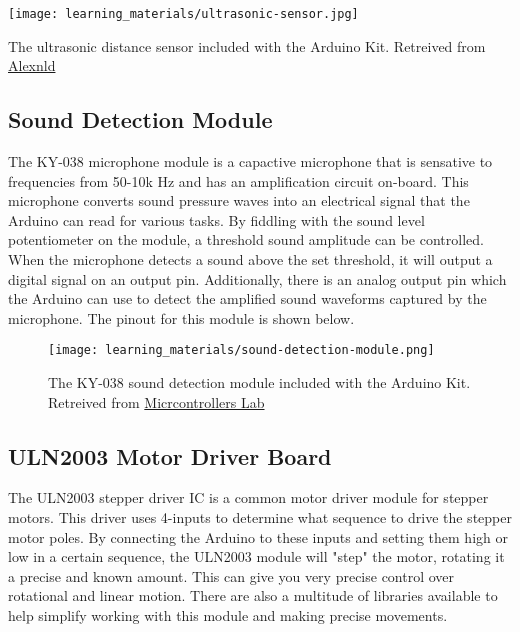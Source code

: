     \begin{marginfigure}[-1.5in]
        \texttt{[image: learning\_materials/ultrasonic-sensor.jpg]}
        \caption[Ultrasonic Sensor]{The ultrasonic distance sensor included with the Arduino Kit. 
        Retreived from \href{https://alexnld.com/wp-content/uploads/2017/12/DIY4002_1.jpg}
        {Alexnld}}
    \end{marginfigure}

    \subsection*{Sound Detection Module}
    The KY-038 microphone module is a capactive microphone that is sensative to frequencies from 50-10k Hz and has an amplification circuit on-board.
    This microphone converts sound pressure waves into an electrical signal that the Arduino can read for various tasks.
    By fiddling with the sound level potentiometer on the module, a threshold sound amplitude can be controlled.
    When the microphone detects a sound above the set threshold, it will output a digital signal on an output pin.
    Additionally, there is an analog output pin which the Arduino can use to detect the amplified sound waveforms captured by the microphone.
    The pinout for this module is shown below.

    \begin{figure}[h!]
        \texttt{[image: learning\_materials/sound-detection-module.png]}
        \caption[Sound Detection Module]{The KY-038 sound detection module included with the Arduino Kit. 
        Retreived from \href{https://microcontrollerslab.com/ky-038-microphone-sound-sensor-module-arduino-tutorial/}
        {Micrcontrollers Lab}}
    \end{figure}

    \subsection*{ULN2003 Motor Driver Board}
    The ULN2003 stepper driver IC is a common motor driver module for stepper motors. 
    This driver uses 4-inputs to determine what sequence to drive the stepper motor poles.
    By connecting the Arduino to these inputs and setting them high or low in a certain sequence, the ULN2003 module will "step" the motor, rotating it a precise and known amount.
    This can give you very precise control over rotational and linear motion.
    There are also a multitude of libraries available to help simplify working with this module and making precise movements.

